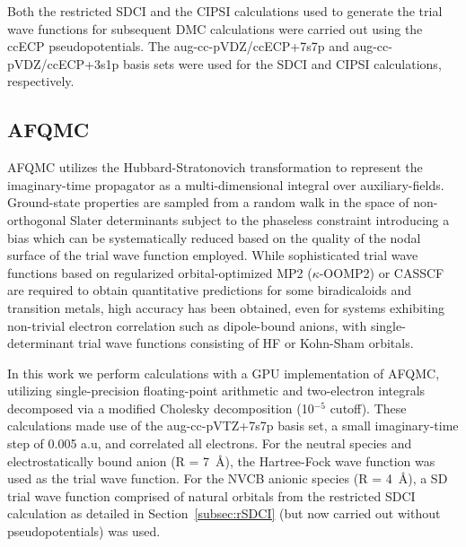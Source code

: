 Both the restricted SDCI and the CIPSI calculations used to generate the trial wave functions for subsequent DMC calculations were carried out using the ccECP pseudopotentials.
The aug-cc-pVDZ/ccECP+7s7p and aug-cc-pVDZ/ccECP+3s1p basis sets were used for the SDCI and CIPSI calculations, respectively.

\subsection{AFQMC}

AFQMC\cite{AFQMC_1, AFQMC_2, AFQMC_3, zhang_quantum_2003, zhang_constrained_1997,motta2018ab,zhang2020ab} utilizes the Hubbard-Stratonovich transformation \cite{hubbard1959calculation} to represent the imaginary-time propagator as a multi-dimensional integral over auxiliary-fields. 
Ground-state properties are sampled from a random walk in the space of non-orthogonal Slater determinants subject to the phaseless constraint\cite{zhang_quantum_2003} introducing a bias which can be systematically reduced based on the quality of the nodal surface of the trial wave function employed.
While sophisticated trial wave functions based on regularized orbital-optimized MP2 ($\kappa$-OOMP2)\cite{lee2020utilizing} or CASSCF\cite{rudshteyn2020predicting,shee2019achieving,kumar2020multiple} are required to obtain quantitative predictions for some biradicaloids and transition metals, high accuracy has been obtained, even for systems exhibiting non-trivial electron correlation such as dipole-bound anions,\cite{hao2018accurate} with single-determinant trial wave functions consisting of HF or Kohn-Sham orbitals.\cite{hao2018accurate,shee2019singlet}

In this work we perform calculations with a GPU implementation of AFQMC,\cite{shee2018phaseless}
utilizing single-precision floating-point arithmetic and two-electron integrals decomposed via a modified Cholesky decomposition (10$^{-5}$ cutoff).\cite{purwanto2011assessing} 
These calculations made use of the aug-cc-pVTZ+7s7p basis set, a small imaginary-time step of 0.005 a.u, and correlated all electrons.
For the neutral species and electrostatically bound anion (R = \SI{7}{\angstrom}), the Hartree-Fock wave function was used as the trial wave function.
For the NVCB anionic species (R = \SI{4}{\angstrom}), a SD trial wave function comprised of natural orbitals from the restricted SDCI calculation as detailed in Section~\ref{subsec:rSDCI} (but now carried out without pseudopotentials) was used.

